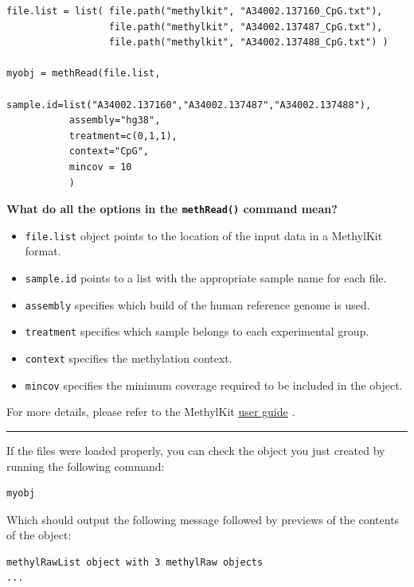 \documentclass[
]{book}
\begin{document}
\begin{verbatim}
file.list = list( file.path("methylkit", "A34002.137160_CpG.txt"),
                  file.path("methylkit", "A34002.137487_CpG.txt"),
                  file.path("methylkit", "A34002.137488_CpG.txt") )

myobj = methRead(file.list,
           sample.id=list("A34002.137160","A34002.137487","A34002.137488"),
           assembly="hg38",
           treatment=c(0,1,1),
           context="CpG",
           mincov = 10
           )
\end{verbatim}

\textbf{What do all the options in the \texttt{methRead()} command mean?}

\begin{itemize}
\item
  \texttt{file.list} object points to the location of the input data in a MethylKit format.
\item
  \texttt{sample.id} points to a list with the appropriate sample name for each file.
\item
  \texttt{assembly} specifies which build of the human reference genome is used.
\item
  \texttt{treatment} specifies which sample belongs to each experimental group.
\item
  \texttt{context} specifies the methylation context.
\item
  \texttt{mincov} specifies the minimum coverage required to be included in the object.
\end{itemize}

For more details, please refer to the MethylKit \href{https://bioconductor.org/packages/release/bioc/manuals/methylKit/man/methylKit.pdf}{user guide} .

\begin{center}\rule{0.5\linewidth}{0.5pt}\end{center}

If the files were loaded properly, you can check the object you just created by running the following command:

\begin{verbatim}
myobj
\end{verbatim}

Which should output the following message followed by previews of the contents of the object:

\begin{verbatim}
methylRawList object with 3 methylRaw objects
...
\end{verbatim}
\end{document}
